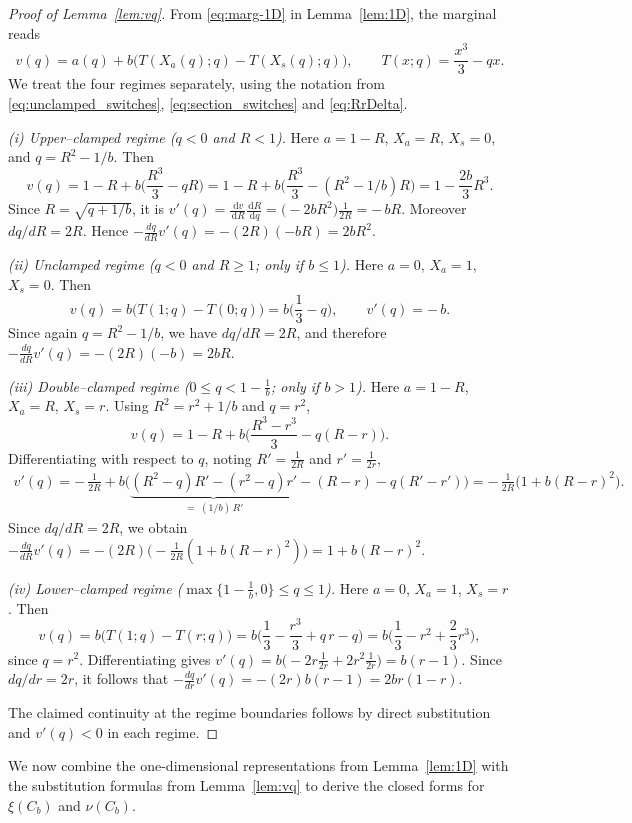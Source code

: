 \documentclass{article}
\newcommand{\1}{\mathds{1}}
\newcommand{\de}{\mathrm{\,d}}
\begin{document}
\begin{proof}[Proof of Lemma~\ref{lem:vq}]
From \eqref{eq:marg-1D} in Lemma~\ref{lem:1D}, the marginal reads
\[
v(q)=a(q)+b\big(T(X_a(q);q)-T(X_s(q);q)\big),
\qquad 
T(x;q)=\frac{x^3}{3}-qx.
\]
We treat the four regimes separately, using the notation from \eqref{eq:unclamped_switches}, \eqref{eq:section_switches} and \eqref{eq:RrDelta}.

\smallskip\noindent
\emph{(i) Upper–clamped regime (\(q<0\) and \(R<1\)).} 
Here \(a=1-R\), \(X_a=R\), \(X_s=0\), and \(q=R^2-1/b\).
Then
\[
v(q)=1-R+b\Big(\frac{R^3}{3}-qR\Big)
=1-R+b\Big(\frac{R^3}{3}-(R^2-1/b)R\Big)
=1-\frac{2b}{3}R^3.
\]
Since \(R=\sqrt{q+1/b}\), it is
\(
v'(q)=\frac{\de v}{\de R}\frac{\de R}{\de q}
=\Big(-2bR^2\Big)\frac{1}{2R}
=-\,bR.
\)
Moreover \(dq/dR=2R\). Hence
\(
-\frac{dq}{dR}v'(q)=-(2R)(-bR)=2bR^2.
\)

\smallskip\noindent
\emph{(ii) Unclamped regime (\(q<0\) and \(R\ge1\); only if \(b\le1\)).} 
Here \(a=0\), \(X_a=1\), \(X_s=0\).
Then
\[
v(q)=b\big(T(1;q)-T(0;q)\big)
=b\Big(\frac{1}{3}-q\Big),
\qquad
v'(q)=-\,b.
\]
Since again \(q=R^2-1/b\), we have \(dq/dR=2R\), and therefore
\(
-\frac{dq}{dR}v'(q)=-(2R)(-b)=2bR.
\)

\smallskip\noindent
\emph{(iii) Double–clamped regime (\(0\le q<1-\tfrac{1}{b}\); only if \(b>1\)).}
Here \(a=1-R\), \(X_a=R\), \(X_s=r\).
Using \(R^2=r^2+1/b\) and \(q=r^2\),
\[
v(q)=1-R+b\Big(\frac{R^3-r^3}{3}-q(R-r)\Big).
\]
Differentiating with respect to \(q\), noting \(R'=\frac{1}{2R}\) and \(r'=\frac{1}{2r}\),
\begin{align*}
v'(q)
=-\,\frac{1}{2R}
 + b\Big(\underbrace{(R^2-q)R' - (r^2-q)r'}_{=\;(1/b)\,R'} - (R-r) - q(R'-r')\Big)
= -\,\frac{1}{2R}\Big(1+b(R-r)^2\Big).
\end{align*}
Since \(dq/dR=2R\), we obtain
\(
-\frac{dq}{dR}v'(q)=-(2R)\Big(-\frac{1}{2R}(1+b(R-r)^2)\Big)
=1+b(R-r)^2.
\)

\smallskip\noindent
\emph{(iv) Lower–clamped regime (\(\max\{1-\tfrac{1}{b},0\}\le q\le 1\)).} 
Here \(a=0\), \(X_a=1\), \(X_s=r\).
Then
\[
v(q)=b\big(T(1;q)-T(r;q)\big)
=b\Big(\frac{1}{3}-\frac{r^3}{3}+q\,r-q\Big)
=b\Big(\frac{1}{3}-r^2+\frac{2}{3}r^3\Big),
\]
since \(q=r^2\).
Differentiating gives
\(
v'(q)=b\Big(-2r\frac{1}{2r}+2r^2\frac{1}{2r}\Big)
=b(r-1).
\)
Since \(dq/dr=2r\), it follows that
\(
-\frac{dq}{dr}v'(q)=-(2r)b(r-1)=2br(1-r).
\)

\smallskip
The claimed continuity at the regime boundaries follows by direct substitution and \(v'(q)<0\) in each regime.
\end{proof}
We now combine the one-dimensional representations from Lemma~\ref{lem:1D} with the substitution formulas from Lemma~\ref{lem:vq} to derive the closed forms for \(\xi(C_b)\) and \(\nu(C_b)\).
\end{document}
